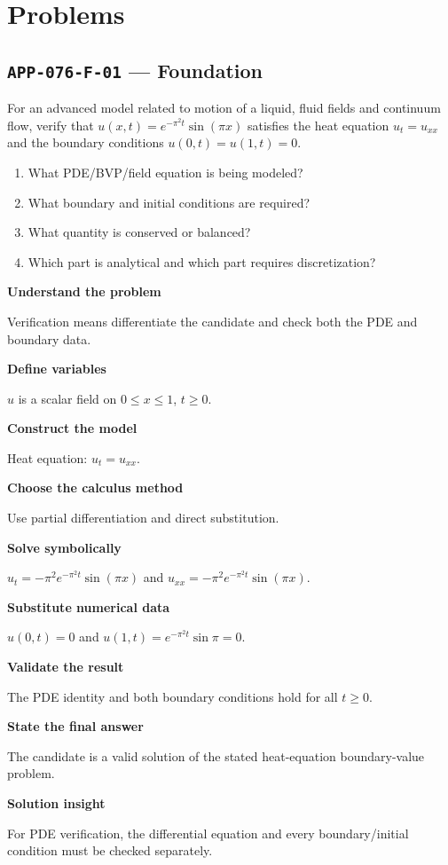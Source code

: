 \documentclass[11pt]{book}
\newcommand{\pid}[1]{\texttt{#1}}
\begin{document}
\section*{Problems}
\subsection*{\pid{APP-076-F-01} — Foundation}
\begin{problembox}
For an advanced model related to motion of a liquid, fluid fields and continuum flow, verify that $u(x,t)=e^{-\pi^2t}\sin(\pi x)$ satisfies the heat equation $u_t=u_{xx}$ and the boundary conditions $u(0,t)=u(1,t)=0$.
\end{problembox}
\begin{promptbox}\begin{enumerate}
\item What PDE/BVP/field equation is being modeled?
\item What boundary and initial conditions are required?
\item What quantity is conserved or balanced?
\item Which part is analytical and which part requires discretization?
\end{enumerate}\end{promptbox}
\begin{solutionbox}
\textbf{Understand the problem}\par Verification means differentiate the candidate and check both the PDE and boundary data.\par\medskip
\textbf{Define variables}\par $u$ is a scalar field on $0\le x\le1$, $t\ge0$.\par\medskip
\textbf{Construct the model}\par Heat equation: $u_t=u_{xx}$.\par\medskip
\textbf{Choose the calculus method}\par Use partial differentiation and direct substitution.\par\medskip
\textbf{Solve symbolically}\par $u_t=-\pi^2 e^{-\pi^2t}\sin(\pi x)$ and $u_{xx}=-\pi^2 e^{-\pi^2t}\sin(\pi x)$.\par\medskip
\textbf{Substitute numerical data}\par $u(0,t)=0$ and $u(1,t)=e^{-\pi^2t}\sin\pi=0$.\par\medskip
\textbf{Validate the result}\par The PDE identity and both boundary conditions hold for all $t\ge0$.\par\medskip
\textbf{State the final answer}\par The candidate is a valid solution of the stated heat-equation boundary-value problem.\par\medskip
\textbf{Solution insight}\par For PDE verification, the differential equation and every boundary/initial condition must be checked separately.\par\medskip
\end{solutionbox}
\end{document}
